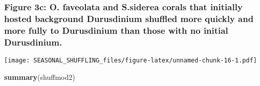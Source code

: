 \documentclass[]{article}
\newenvironment{Shaded}{\begin{snugshade}}{\end{snugshade}}
\newcommand{\CommentTok}[1]{\textcolor[rgb]{0.56,0.35,0.01}{\textit{#1}}}
\newcommand{\DataTypeTok}[1]{\textcolor[rgb]{0.13,0.29,0.53}{#1}}
\newcommand{\DecValTok}[1]{\textcolor[rgb]{0.00,0.00,0.81}{#1}}
\newcommand{\KeywordTok}[1]{\textcolor[rgb]{0.13,0.29,0.53}{\textbf{#1}}}
\newcommand{\NormalTok}[1]{#1}
\newcommand{\OperatorTok}[1]{\textcolor[rgb]{0.81,0.36,0.00}{\textbf{#1}}}
\newcommand{\StringTok}[1]{\textcolor[rgb]{0.31,0.60,0.02}{#1}}
\begin{document}
\hypertarget{figure-3c-o.-faveolata-and-s.siderea-corals-that-initially-hosted-background-durusdinium-shuffled-more-quickly-and-more-fully-to-durusdinium-than-those-with-no-initial-durusdinium.}{%
\subsubsection{Figure 3c: O. faveolata and S.siderea corals that
initially hosted background Durusdinium shuffled more quickly and more
fully to Durusdinium than those with no initial
Durusdinium.}\label{figure-3c-o.-faveolata-and-s.siderea-corals-that-initially-hosted-background-durusdinium-shuffled-more-quickly-and-more-fully-to-durusdinium-than-those-with-no-initial-durusdinium.}}

\begin{Shaded}
\end{Shaded}

\texttt{[image: SEASONAL\_SHUFFLING\_files/figure-latex/unnamed-chunk-16-1.pdf]}

\begin{Shaded}
\begin{Highlighting}[]
\KeywordTok{summary}\NormalTok{(shuffmod2) }
\end{Highlighting}
\end{Shaded}
\end{document}
